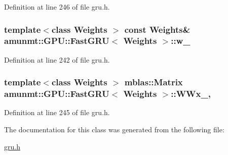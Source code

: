 Definition at line 246 of file gru.\+h.

\subsubsection[{\texorpdfstring{w\+\_\+}{w_}}]{\setlength{\rightskip}{0pt plus 5cm}template$<$class Weights $>$ const {\bf Weights}\& {\bf amunmt\+::\+G\+P\+U\+::\+Fast\+G\+RU}$<$ {\bf Weights} $>$\+::w\+\_\+\hspace{0.3cm}{\ttfamily [private]}}\hypertarget{classamunmt_1_1GPU_1_1FastGRU_a299bff28c9a4fb76e3fdf423137e24a2}{}\label{classamunmt_1_1GPU_1_1FastGRU_a299bff28c9a4fb76e3fdf423137e24a2}


Definition at line 242 of file gru.\+h.

\subsubsection[{\texorpdfstring{W\+Wx\+\_\+}{WWx_}}]{\setlength{\rightskip}{0pt plus 5cm}template$<$class Weights $>$ {\bf mblas\+::\+Matrix} {\bf amunmt\+::\+G\+P\+U\+::\+Fast\+G\+RU}$<$ {\bf Weights} $>$\+::W\+Wx\+\_\+\hspace{0.3cm}{\ttfamily [mutable]}, {\ttfamily [private]}}\hypertarget{classamunmt_1_1GPU_1_1FastGRU_ae7d4a31966763ba9c724d6c5668f672b}{}\label{classamunmt_1_1GPU_1_1FastGRU_ae7d4a31966763ba9c724d6c5668f672b}


Definition at line 245 of file gru.\+h.



The documentation for this class was generated from the following file\+:\begin{DoxyCompactItemize}
\item 
\hyperlink{gru_8h}{gru.\+h}\end{DoxyCompactItemize}
